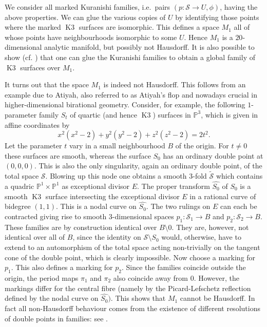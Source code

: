 \documentclass[a4paper,11pt]{article}
\newcommand{\PP}{\mathbb P}
\newcommand{\cS}{\mathcal S}
\renewcommand{\Tilde}{\widetilde}
\newcommand{\Kthree}{\mathop{\mathrm {K3}}\nolimits}
\begin{document}
We consider all marked Kuranishi families, i.e.\ pairs $(p\colon \cS
\to U,\phi)$, having the above properties.  We can glue the various
copies of $U$ by identifying those points where the marked $\Kthree$
surfaces are isomorphic.  This defines a space $M_1$ all of whose
points have neighbourhoods isomorphic to some $U$. Hence $M_1$ is a
$20$-dimensional analytic manifold, but possibly not Hausdorff. It is
also possible to show (cf. \cite[Theorem VIII.10.6]{BHPV}) that one
can glue the Kuranishi families to obtain a global family of $\Kthree$
surfaces over $M_1$.

It turns out that the space $M_1$ is indeed not Hausdorff. This
follows from an example due to Atiyah, also referred to as Atiyah's
flop and nowadays crucial in higher-dimensional birational geometry.
Consider, for example, the following $1$-parameter family $S_t$ of
quartic (and hence $\Kthree$) surfaces in $\PP^3$, which is given in
affine coordinates by
\begin{equation*}
x^2(x^2-2) + y^2(y^2-2) + z^2(z^2-2) = 2t^2.
\end{equation*}
Let the parameter $t$ vary in a small neighbourhood $B$ of the
origin.  For $t \neq 0$ these surfaces are smooth, whereas the surface
$S_0$ has an ordinary double point at $(0,0,0)$. This is also the only
singularity, again an ordinary double point, of the total space $\cS$.
Blowing up this node one obtains a smooth $3$-fold $\Tilde{\cS}$
which contains a quadric $\PP^1 \times \PP^1$ as exceptional divisor
$E$.  The proper transform $\hat{S_0}$ of $S_0$ is a smooth $\Kthree$
surface intersecting the exceptional divisor $E$ in a rational curve
of bidegree $(1,1)$.  This is a nodal curve on $\hat{S_0}$. The two
rulings on $E$ can each be contracted giving rise to smooth
$3$-dimensional spaces $p_1\colon \cS_1 \to B$ and $p_2\colon \cS_2
\to B$.  These families are by construction identical over $B
\setminus 0$. They are, however, not identical over all of $B$, since
the identity on $\cS \setminus S_0$ would, otherwise, have to extend
to an automorphism of the total space acting non-trivially on the
tangent cone of the double point, which is clearly impossible. Now
choose a marking for $p_1$. This also defines a marking for $p_2$.
Since the families coincide outside the origin, the period maps
$\pi_1$ and $\pi_2$ also coincide away from $0$.  However, the
markings differ for the central fibre (namely by the Picard-Lefschetz
reflection defined by the nodal curve on $\hat{S_0})$. This shows that
$M_1$ cannot be Hausdorff.  In fact all non-Hausdorff behaviour comes
from the existence of different resolutions of double points in
families: see \cite[Theorem 1${}^\prime$ and Section 7]{BR}.
\end{document}
